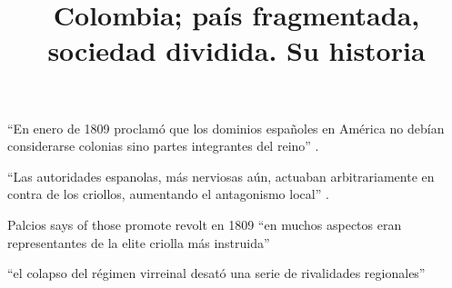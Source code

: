 \documentclass[12pt]{article}
\title{Colombia; país fragmentada, sociedad dividida. Su historia}
\makeatletter
\newcommand\iraggedright{%
	\let\\\@centercr\@rightskip\@flushglue \rightskip\@rightskip
	\leftskip\z@skip}
\makeatother
\begin{document}
	\makeheader
	\iraggedright
	
\enquote{En enero de 1809 proclamó que los dominios españoles en América no debían considerarse colonias sino partes integrantes del reino} \cite[192]{Palacios2002}.

\enquote{Las autoridades espanolas, más nerviosas aún, actuaban arbitrariamente en contra de los criollos, aumentando el antagonismo local} \cite[192]{Palacios2002}.

Palcios says of those promote revolt en 1809 \enquote{en muchos aspectos eran representantes de la elite criolla más instruida} \cite[197]{Palacios2002}

\enquote{el colapso del régimen virreinal desató una serie de rivalidades regionales} \cite[205]{Palacios2002}


\makeworkscited
\listoftodos
\end{document}

